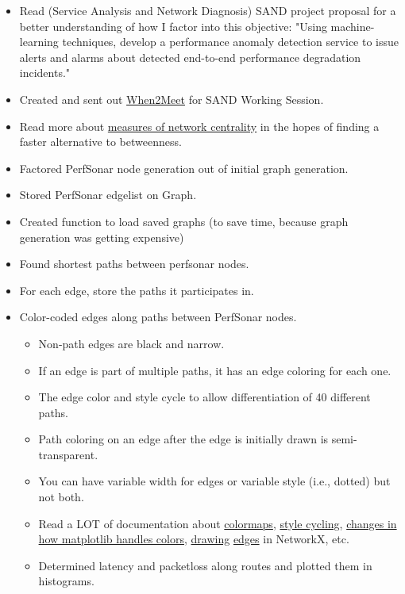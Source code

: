 \documentclass{weeklyreport}
\begin{document}
\begin{itemize}
    \item Read (Service Analysis and Network Diagnosis) SAND project proposal for a better understanding of how I factor into this objective: "Using machine-learning techniques, develop a performance anomaly detection service to issue alerts and alarms about detected end-to-end performance degradation incidents."
    \item Created and sent out \href{https://www.when2meet.com/?9419368-8jTlX}{When2Meet} for SAND Working Session.
    \item Read more about \href{https://en.wikipedia.org/wiki/Centrality}{measures of network centrality} in the hopes of finding a faster alternative to betweenness.
    \item Factored PerfSonar node generation out of initial graph generation.
    \item Stored PerfSonar edgelist on Graph.
    \item Created function to load saved graphs (to save time, because graph generation was getting expensive)
    \item Found shortest paths between perfsonar nodes.
    \item For each edge, store the paths it participates in.
    \item Color-coded edges along paths between PerfSonar nodes.
    \begin{itemize}
    	\item Non-path edges are black and narrow.
    	\item If an edge is part of multiple paths, it has an edge coloring for each one.
    	\item The edge color and style cycle to allow differentiation of 40 different paths.
    	\item Path coloring on an edge after the edge is initially drawn is semi-transparent.
    	\item You can have variable width for edges or variable style (i.e., dotted) but not both.
    	\item Read a LOT of documentation about \href{https://matplotlib.org/3.2.2/tutorials/colors/colormaps.html#sphx-glr-tutorials-colors-colormaps-py}{colormaps}, \href{https://matplotlib.org/3.2.2/tutorials/intermediate/color_cycle.html#sphx-glr-tutorials-intermediate-color-cycle-py}{style cycling}, \href{https://matplotlib.org/users/dflt_style_changes.html}{changes in how matplotlib handles colors}, \href{https://networkx.github.io/documentation/stable/reference/generated/networkx.drawing.nx_pylab.draw_networkx.html}{drawing} \href{https://networkx.github.io/documentation/stable/reference/generated/networkx.drawing.nx_pylab.draw_networkx_edges.html}{edges} in NetworkX, etc.
    	\item Determined latency and packetloss along routes and plotted them in histograms.
    \end{itemize}
\end{itemize}
\end{document}
